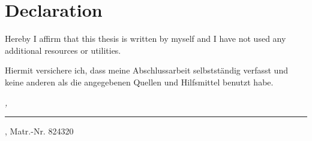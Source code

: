 %
\chapter*{Declaration}
\label{sec:declaration}
\thispagestyle{empty}

Hereby I affirm that this thesis is written by myself and I have not used any 
additional resources or utilities.

\begin{center}
	\hrulefill
\end{center}

Hiermit versichere ich, dass meine Abschlussarbeit selbstständig verfasst und 
keine anderen als die angegebenen Quellen und Hilfsmittel benutzt habe.

\bigskip

\noindent\textit{\thesisUniversityCity, \thesisDate}

\smallskip

\begin{flushright}
	\begin{minipage}{5cm}
		\rule{\textwidth}{1pt}
		\centering\thesisName, Matr.-Nr. 824320
	\end{minipage}
\end{flushright}

